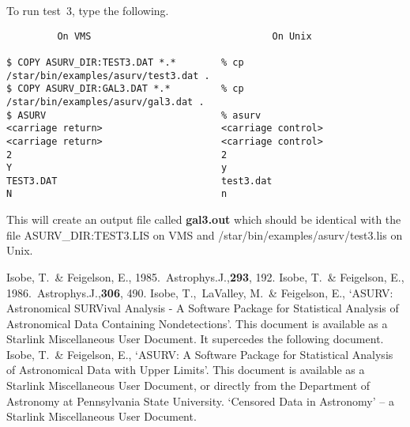 To run test~3, type the following.

\begin{verbatim}
         On VMS                                On Unix

$ COPY ASURV_DIR:TEST3.DAT *.*        % cp /star/bin/examples/asurv/test3.dat .
$ COPY ASURV_DIR:GAL3.DAT *.*         % cp /star/bin/examples/asurv/gal3.dat .
$ ASURV                               % asurv
<carriage return>                     <carriage control>
<carriage return>                     <carriage control>
2                                     2
Y                                     y
TEST3.DAT                             test3.dat
N                                     n
\end{verbatim}

This will create an output file called {\bf gal3.out} which should be identical
with the file ASURV\-\_DIR:\-TEST3.LIS on VMS and
/star\-/bin\-/examples\-/asurv\-/test3.lis on Unix.

\begin{thebibliography}{9}
 Isobe, T.\ \& Feigelson, E., 1985.\ Astrophys.J.,{\bf 293},
192.
 Isobe, T.\ \& Feigelson, E., 1986.\ Astrophys.J.,{\bf 306},
490.
 Isobe, T.,\ LaValley, M.\ \& Feigelson, E., `ASURV:
Astronomical SURVival Analysis - A Software Package for Statistical Analysis of
Astronomical Data Containing Nondetections'. This document is available as a
Starlink Miscellaneous User Document. It supercedes the following document.
 Isobe, T.\ \& Feigelson, E., `ASURV: A
Software Package for Statistical Analysis of Astronomical Data with Upper
Limits'. This document is available as a Starlink Miscellaneous User Document,
or directly from the Department of Astronomy at Pennsylvania State University.
 `Censored Data in Astronomy' -- a Starlink Miscellaneous User
Document.
\end{thebibliography}


